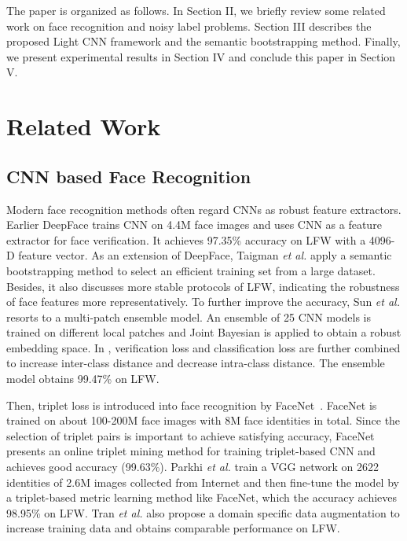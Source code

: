 \documentclass[journal,transmag]{IEEEtran}
\begin{document}
The paper is organized as follows. In Section II, we briefly review some related work on face recognition and noisy label problems. Section III describes the proposed Light CNN framework and the semantic bootstrapping method. Finally, we present experimental results in Section IV and conclude this paper in Section V.

\section{Related Work}
\subsection{CNN based Face Recognition}
Modern face recognition methods often regard CNNs as robust feature extractors.
Earlier DeepFace \cite{taigman2014deepface} trains CNN on 4.4M face images and uses CNN as a feature extractor for face verification.
It achieves 97.35\% accuracy on LFW with a 4096-D feature vector.
As an extension of DeepFace, Taigman \emph{et al.} \cite{taigman2014web} apply a semantic bootstrapping method to select an efficient training set from a large dataset.
Besides, it also discusses more stable protocols \cite{best2014unconstrained} of LFW, indicating the robustness of face features more representatively.
To further improve the accuracy, Sun \emph{et al.} \cite{sun2014deep} resorts to a multi-patch ensemble model.
An ensemble of 25 CNN models is trained on different local patches and Joint Bayesian is applied to obtain a robust embedding space.
In \cite{DBLP:conf/cvpr/SunWT15}, verification loss and classification loss are further combined to increase inter-class distance and decrease intra-class distance.
The ensemble model obtains 99.47\% on LFW.

Then, triplet loss is introduced into face recognition by FaceNet~\cite{schroff2015facenet}.
FaceNet is trained on about 100-200M face images with 8M face identities in total.
Since the selection of triplet pairs is important to achieve satisfying accuracy, FaceNet presents an online triplet mining method for training triplet-based CNN and achieves good accuracy (99.63\%).
Parkhi \emph{et al.} \cite{parkhi2015deep} train a VGG network \cite{simonyan2014very} on 2622 identities of 2.6M images collected from Internet and then fine-tune the model by a triplet-based metric learning method like FaceNet, which the accuracy achieves 98.95\% on LFW. Tran \emph{et al.} \cite{masi2016we} also propose a domain specific data augmentation to increase training data and obtains comparable performance on LFW.
\end{document}
